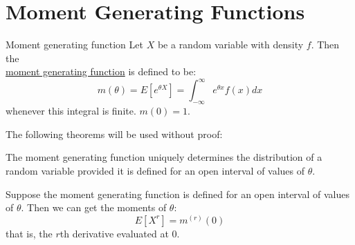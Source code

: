 \documentclass[../Main.tex]{subfiles}
\begin{document}
\section{Moment Generating Functions}
\begin{definition}{Moment generating function}
    Let $X$ be a random variable with density $f$. Then the \\\underline{moment generating function} is defined to be:
    \begin{equation*}
        m(\theta) = E[e^{\theta X}] = \int_{-\infty}^\infty e^{\theta x} f(x) dx
    \end{equation*}
    whenever this integral is finite. $m(0) = 1$.
\end{definition}
The following theorems will be used without proof:
\begin{theorem}
    The moment generating function uniquely determines the distribution of a random variable provided it is defined for an open interval of values of $\theta$.
    \label{thmMGFDetermines}
\end{theorem}
\begin{theorem}
    Suppose the moment generating function is defined for an open interval of values of $\theta$. Then we can get the moments of $\theta$:
    \begin{equation*}
        E[X^r] = m^{(r)}(0)
    \end{equation*}
    that is, the $r$th derivative evaluated at 0.
\end{theorem}
\end{document}
